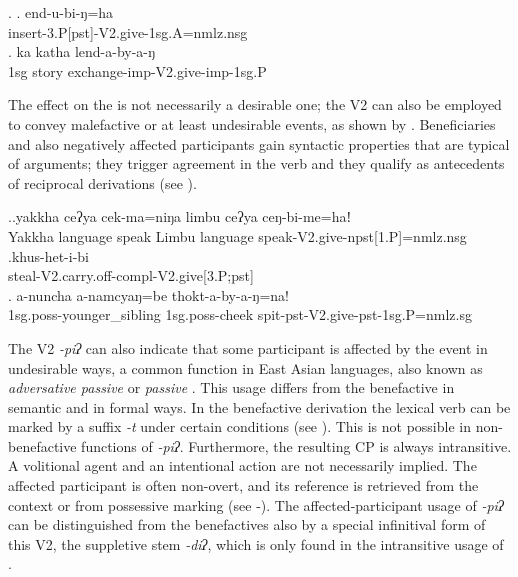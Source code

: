 \ex. \ag. end-u-bi-ŋ=ha\\
		insert{\sc -3.P[pst]-V2.give-1sg.A=nmlz.nsg}\\
	\bg. ka katha lend-a-by-a-ŋ\\
	{\sc 1sg} story  exchange{\sc -imp-V2.give-imp-1sg.P}\\

The effect on the  is not necessarily a desirable one; the V2 can also be employed to 
convey malefactive or at least undesirable events, as shown by \Next. Beneficiaries and also negatively affected participants gain syntactic properties that are typical of arguments; they  trigger agreement in the verb and they qualify as antecedents of reciprocal derivations (see ). 

\ex.\ag.yakkha ceʔya cek-ma=niŋa limbu ceʔya ceŋ-bi-me=haǃ\\
Yakkha language  speak Limbu language speak{\sc -V2.give-npst[1.P]=nmlz.nsg}\\
\bg.khus-het-i-bi\\
steal{\sc -V2.carry.off-compl-V2.give[3.P;pst]}\\
\bg. a-nuncha a-namcyaŋ=be thokt-a-by-a-ŋ=na!\\
{\sc 1sg.poss-}younger\_sibling {\sc 1sg.poss-}cheek  spit{\sc -pst-V2.give-pst-1sg.P=nmlz.sg}\\


The   V2 \emph{-piʔ}  can also indicate that some participant is affected by the event in undesirable ways, a common function in East Asian languages, also known as \emph{adversative passive} or \emph{ passive} \citep{Keenanetal2007Passives, Yapetal1998_give}. This usage differs from the benefactive in semantic and in formal ways.  In the benefactive derivation the lexical verb can be marked by a suffix \emph{-t} under certain conditions (see ). This is not possible in non-benefactive functions of  \emph{-piʔ}.  Furthermore, the resulting CP is always intransitive. A volitional agent  and an intentional action are not necessarily implied. The affected participant is often non-overt, and its reference is retrieved from the context or from possessive marking (see \Next[c]-\Next[d]). The affected-participant usage of \emph{-piʔ} can be distinguished from the benefactives also by a special infinitival form of this V2, the suppletive stem \emph{-diʔ}, which is only found in the intransitive usage of . 

